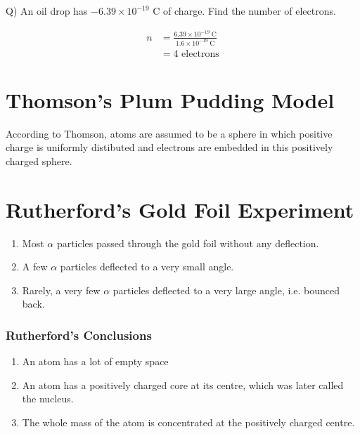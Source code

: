 \documentclass[12pt,a4paper]{article}
\newcommand{\answer}{\tcblower}
\begin{document}
\begin{question}

  Q) An oil drop has $-6.39\times 10^{-19}$ C of charge. Find the number of electrons.

  \answer

  \begin{align*}
    n & = \frac{6.39\times 10^{-19} \mathrm{\ C}}{1.6\times 10^{-19} \mathrm{\ C}} \\
      & = 4 \text{ electrons}
  \end{align*}

\end{question}

\section*{Thomson's Plum Pudding Model}


According to Thomson, atoms are assumed to be a sphere in which positive charge is uniformly distibuted and electrons are embedded in this positively charged sphere.

\section*{Rutherford's Gold Foil Experiment}


\begin{enumerate}
  \item Most $\alpha$ particles passed through the gold foil without any deflection.
  \item A few $\alpha$ particles deflected to a very small angle.
  \item Rarely, a very few $\alpha$ particles deflected to a very large angle, i.e. bounced back.
\end{enumerate}

\subsubsection*{Rutherford's Conclusions}

\begin{enumerate}
  \item An atom has a lot of empty space
  \item An atom has a positively charged core at its centre, which was later called the nucleus.
  \item The whole mass of the atom is concentrated at the positively charged centre.
\end{enumerate}
\end{document}
